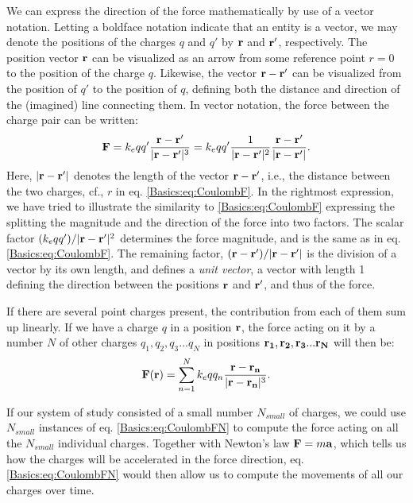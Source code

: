 We can express the direction of the force mathematically by use of a vector notation. Letting a boldface notation indicate that an entity is a vector, we may denote the positions of the charges $q$ and $q'$ by ${\bf r}$ and ${\bf r'}$, respectively. The position vector ${\bf r}$ can be visualized as an arrow from some reference point $r=0$ to the position of the charge $q$. Likewise, the vector ${\bf r}-{\bf r'}$ can be visualized from the position of $q'$ to the position of $q$, defining both the distance and direction of the (imagined) line connecting them. In vector notation, the force between the charge pair can be written:
\begin{equation}
{\bf F} = k_e q q' \frac{{\bf r}-{\bf r'}}{|{\bf r}-{\bf r'}|^3} = k_e  qq'  \frac{1}{|{\bf r}-{\bf r'}|^2} \frac{{\bf r}-{\bf r'}}{|{\bf r}-{\bf r'}|}.
\label{Basics:eq:CoulombFvec}
\end{equation}
Here, $|{\bf r}-{\bf r'}|$ denotes the length of the vector ${\bf r}-{\bf r'}$, i.e., the distance between the two charges, cf., $r$ in eq. \ref{Basics:eq:CoulombF}. In the rightmost expression, we have tried to illustrate the similarity to \ref{Basics:eq:CoulombF} expressing the splitting the magnitude and the direction of the force into two factors. The scalar factor $(k_e qq')/|{\bf r}-{\bf r'}|^2$ determines the force magnitude, and is the same as in eq. \ref{Basics:eq:CoulombF}. The remaining factor, $({\bf r}-{\bf r'})/|{\bf r}-{\bf r'}|$ is the division of a vector by its own length, and defines a \textit{unit vector}, a vector with length 1 defining the direction between the positions ${\bf r}$ and ${\bf r'}$, and thus of the force. 

If there are several point charges present, the contribution from each of them sum up linearly. If we have a charge $q$ in a position ${\bf r}$, the force acting on it by a number $N$ of other charges $q_1, q_2, q_3 ... q_N$ in positions ${\bf r_1}, {\bf r_2}, {\bf r_3} ... {\bf r_N}$ will then be:
\begin{equation}
{\bf F}({\bf r}) = \sum_{n=1}^N k_e q q_n \frac{{\bf r}-{\bf r_n}}{|{\bf r}-{\bf r_n}|^3}.
\label{Basics:eq:CoulombFN}
\end{equation}

If our system of study consisted of a small number $N_{small}$ of charges, we could use $N_{small}$ instances of eq. \ref{Basics:eq:CoulombFN} to compute the force acting on all the $N_{small}$ individual charges. Together with Newton's law ${\bf F} = m {\bf a}$, which tells us how the charges will be accelerated in the force direction, eq.\ref{Basics:eq:CoulombFN} would then allow us to compute the movements of all our charges over time. 

